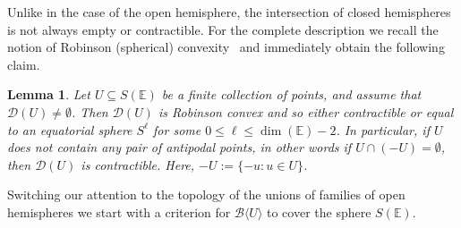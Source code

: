 \documentclass[a4paper,11pt,reqno, english]{amsart}
\newtheorem{lemma}[theorem]{Lemma}
\theoremstyle{definition}
\theoremstyle{remark}
\newcommand\E{\mathbb{E}}
\begin{document}
\medskip
Unlike in the case of the open hemisphere, the intersection of closed hemispheres is not always empty or contractible.
For the complete description we recall the notion of Robinson (spherical) convexity~\cite[Sec.\,9.1.\,(R)]{DanzerEtAl1963} and immediately obtain the following claim.

\begin{lemma}
	\label{lem : Robinson convex}
	Let $U\subseteq S(\E)$ be a finite collection of points, and assume that $\mathscr{D}(U)\neq\emptyset$.
	Then $\mathscr{D}(U)$ is Robinson convex and so either contractible or equal to an equatorial sphere $S^{\ell}$ for some $0\leq \ell\leq \dim(\E)-2$.
	In particular, if $U$ does not contain any pair of antipodal points, in other words if $U\cap (-U)=\emptyset$, then $\mathscr{D}(U)$ is contractible.
	Here, $-U:=\{-u : u\in U\}$.

\end{lemma}



\medskip
Switching our attention to the topology of the unions of families of open hemispheres we start with a criterion for $\mathscr{B}\langle U\rangle$ to cover the sphere $S(\E)$.
\end{document}
